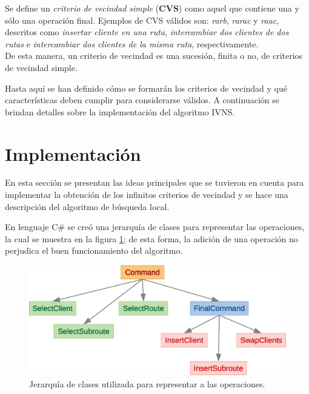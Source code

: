 \documentclass[a4paper,10pt,twocolumn]{article}
\begin{document}
	Se define un \textit{criterio de vecindad simple} (\textbf{CVS}) como aquel que 
	contiene una y sólo una operación final. Ejemplos de CVS válidos son:
	\textit{rarb}, \textit{rarac} y \textit{raac}, descritos como \textit{insertar 
	cliente en una ruta}, \textit{intercambiar dos clientes de dos rutas} e
	\textit{intercambiar dos clientes de la misma ruta}, respectivamente.\\
	De esta manera, un criterio de vecindad es una sucesión, finita o no, de criterios 
	de vecindad simple.

	Hasta aquí se han definido cómo se formarán los criterios de vecindad y qu\'e
	características deben cumplir para considerarse válidos. A continuación se brindan 
	detalles sobre la implementación del algoritmo IVNS.
\section{Implementación}\label{sec:impl}
	En esta sección se presentan las ideas principales que se tuvieron en cuenta para 
	implementar la obtención de los infinitos criterios de vecindad y se hace una 
	des\-crip\-ción del algoritmo de búsqueda local.

	En lenguaje \textsc{C\#} se creó una jerarquía de clases para representar las 
	operaciones, la cual se muestra en la figura \ref{fig:hierarchy}; de esta forma,
	la adición de una operación no perjudica el buen funcionamiento del algoritmo.

	\begin{figure}[htb] %
		\begin{center}
			\includegraphics[scale=.43]{Graphics/hierarchy.eps}
		\end{center}
		\caption{Jerarquía de clases utilizada para representar a las operaciones.
		\label{fig:hierarchy}}
	\end{figure}
	
\end{document}
